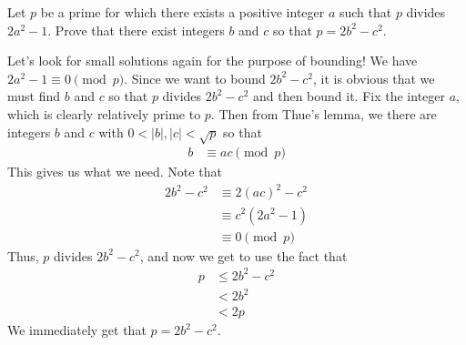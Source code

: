 \begin{problem}
	Let $p$ be a prime for which there exists a positive integer $a$ such that $p$ divides $2a^2-1$. Prove that there exist integers $b$ and $c$ so that $p=2b^2-c^2$.
\end{problem}

\begin{solution}
	Let's look for small solutions again for the purpose of bounding! We have $2a^2-1\equiv0\pmod p$. Since we want to bound $2b^2-c^2$, it is obvious that we must find $b$ and $c$ so that $p$ divides $2b^2-c^2$ and then bound it. Fix the integer $a$, which is clearly relatively prime to $p$. Then from Thue's lemma, we there are integers $b$ and $c$ with $0<|b|,|c|<\sqrt{p}$ so that
	\begin{align*}
		b & \equiv ac\pmod p
	\end{align*}
	This gives us what we need. Note that
	\begin{align*}
		2b^2-c^2 & \equiv 2(ac)^2-c^2\\
		& \equiv c^2(2a^2-1)\\
		& \equiv 0\pmod p
	\end{align*}
	Thus, $p$ divides $2b^2-c^2$, and now we get to use the fact that
	\begin{align*}
		p & \leq 2b^2-c^2\\
		& < 2b^2 \\
		& < 2p
	\end{align*}
	We immediately get that $p=2b^2-c^2$.
\end{solution}

